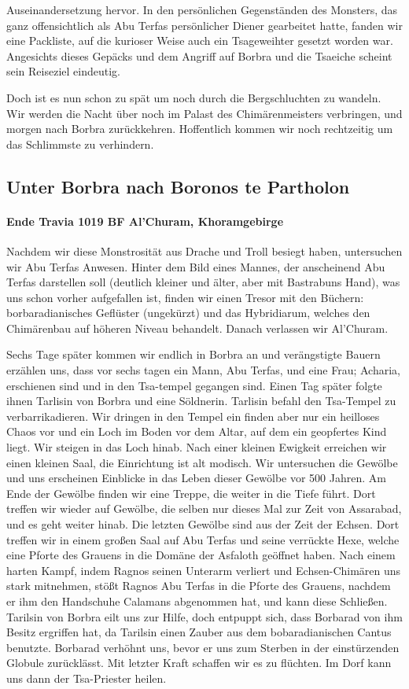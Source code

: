 Auseinandersetzung hervor. In den persönlichen Gegenständen des Monsters, das ganz offensichtlich als Abu Terfas persönlicher Diener gearbeitet hatte, fanden wir eine Packliste, auf die kurioser Weise auch ein Tsageweihter gesetzt worden war. Angesichts dieses Gepäcks und dem Angriff auf Borbra und die Tsaeiche scheint sein Reiseziel eindeutig.

Doch ist es nun schon zu spät um noch durch die Bergschluchten zu wandeln. Wir werden die Nacht über noch im Palast des Chimärenmeisters verbringen, und morgen nach Borbra zurückkehren. Hoffentlich kommen wir noch rechtzeitig um das Schlimmste zu verhindern.

\subsection{Unter Borbra nach Boronos te Partholon}

\paragraph{Ende Travia 1019 BF Al'Churam, Khoramgebirge}
Nachdem wir diese Monstrosität aus Drache und Troll besiegt haben, untersuchen wir Abu Terfas Anwesen. Hinter dem Bild eines Mannes, der anscheinend Abu Terfas darstellen soll (deutlich kleiner und älter, aber mit Bastrabuns Hand), was uns schon vorher aufgefallen ist, finden wir einen Tresor mit den Büchern: borbaradianisches Geflüster (ungekürzt) und das Hybridiarum, welches den Chimärenbau auf höheren Niveau behandelt.
Danach verlassen wir Al'Churam.

Sechs Tage später kommen wir endlich in Borbra an und verängstigte Bauern erzählen uns, dass vor sechs tagen ein Mann, Abu Terfas, und eine Frau; Acharia, erschienen sind und in den Tsa-tempel gegangen sind. Einen Tag später folgte ihnen Tarlisin von Borbra und eine Söldnerin. Tarlisin befahl den Tsa-Tempel zu verbarrikadieren. Wir dringen in den Tempel ein finden aber nur ein heilloses Chaos vor und ein Loch im Boden vor dem Altar, auf dem ein geopfertes Kind liegt. Wir steigen in das Loch hinab.
Nach einer kleinen Ewigkeit erreichen wir einen kleinen Saal, die Einrichtung ist alt modisch. Wir untersuchen die Gewölbe und uns erscheinen Einblicke in das Leben dieser Gewölbe vor 500 Jahren. Am Ende der Gewölbe finden wir eine Treppe, die weiter in die Tiefe führt. Dort treffen wir wieder auf Gewölbe, die selben nur dieses Mal zur Zeit von Assarabad, und es geht weiter hinab. Die letzten Gewölbe sind aus der Zeit der Echsen. Dort treffen wir in einem großen Saal auf Abu Terfas und seine verrückte Hexe, welche eine Pforte des Grauens in die Domäne der Asfaloth geöffnet haben.
Nach einem harten Kampf, indem Ragnos seinen Unterarm verliert und Echsen-Chimären uns stark mitnehmen, stößt Ragnos Abu Terfas in die Pforte des Grauens, nachdem er ihm den Handschuhe Calamans abgenommen hat, und kann diese Schließen.
Tarilsin von Borbra eilt uns zur Hilfe, doch entpuppt sich, dass Borbarad von ihm Besitz ergriffen hat, da Tarilsin einen Zauber aus dem bobaradianischen Cantus benutzte. Borbarad verhöhnt uns, bevor er uns zum Sterben in der einstürzenden Globule zurücklässt. Mit letzter Kraft schaffen wir es zu flüchten. Im Dorf kann uns dann der Tsa-Priester heilen.

